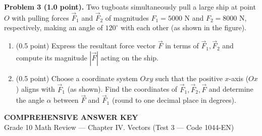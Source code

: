 \documentclass[10pt,a4paper]{article}
\begin{document}
\vspace{6pt}
\textbf{Problem 3 (1.0 point).} Two tugboats simultaneously pull a large ship at point $O$ with pulling forces $\vec{F}_1$ and $\vec{F}_2$ of magnitudes $F_1 = 5000\text{ N}$ and $F_2 = 8000\text{ N}$, respectively, making an angle of $120^\circ$ with each other (as shown in the figure).
\par\noindent\begin{minipage}[t]{0.70\linewidth}
\begin{enumerate}[label=\alph*), leftmargin=0.6cm, itemsep=2pt]
    \item (0.5 point) Express the resultant force vector $\vec{F}$ in terms of $\vec{F}_1, \vec{F}_2$ and compute its magnitude $|\vec{F}|$ acting on the ship.
    \item (0.5 point) Choose a coordinate system $Oxy$ such that the positive $x$-axis ($Ox$) aligns with $\vec{F}_1$ (as shown). Find the coordinates of $\vec{F}_1, \vec{F}_2, \vec{F}$ and determine the angle $\alpha$ between $\vec{F}$ and $\vec{F}_1$ (round to one decimal place in degrees).
\end{enumerate}
\end{minipage}\hfill
\begin{minipage}[t]{0.28\linewidth}\raggedleft\vspace{-15pt}
\end{minipage}


\newpage
\pagestyle{dapan}
\setcounter{page}{1}

\begin{center}
  {\Large\bfseries\color{ink} COMPREHENSIVE ANSWER KEY}\\[2pt]
  {\small\color{gray!75!black} Grade 10 Math Review — Chapter IV. Vectors (Test 3 — Code 1044-EN)}
\end{center}
\vspace{1pt}
\end{document}
